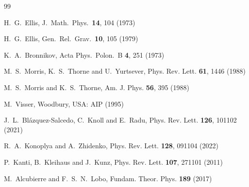 \documentclass[aps,prd,12pt,superscriptaddress]{revtex4-2}
\begin{document}
\begin{thebibliography}{99}

  H.~G.~Ellis,
  J.\ Math.\ Phys.\  {\bf 14}, 104 (1973)

  H.~G.~Ellis,
  Gen.\ Rel.\ Grav.\  {\bf 10}, 105 (1979)

  K.~A.~Bronnikov,
  Acta Phys.\ Polon.\ B {\bf 4}, 251 (1973)

M.~S.~Morris, K.~S.~Thorne and U.~Yurtsever,
Phys. Rev. Lett. \textbf{61}, 1446 (1988)

M.~S.~Morris and K.~S.~Thorne,
Am. J. Phys. \textbf{56}, 395 (1988)

  M.~Visser,
  Woodbury, USA: AIP (1995)

J.~L.~Bl\'azquez-Salcedo, C.~Knoll and E.~Radu,
Phys. Rev. Lett. \textbf{126}, 101102 (2021)

R.~A.~Konoplya and A.~Zhidenko,
Phys. Rev. Lett. \textbf{128}, 091104 (2022)

P.~Kanti, B.~Kleihaus and J.~Kunz,
Phys. Rev. Lett. \textbf{107}, 271101 (2011)

M.~Alcubierre and F.~S.~N.~Lobo,
Fundam. Theor. Phys. \textbf{189} (2017) 



\end{thebibliography}
\end{document}
